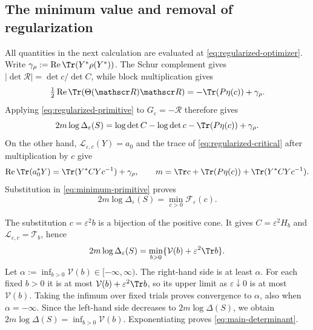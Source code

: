 \subsection{The minimum value and removal of regularization}
All quantities in the next calculation are evaluated at \eqref{eq:regularized-optimizer}.
Write $\gamma_\rho:=\operatorname{Re}\Tr(Y^*\rho(Y^*))$.
The Schur complement gives $|\det\mathscr R|=\det c/\det C$, while block multiplication gives
\[
 \tfrac12\operatorname{Re}\Tr(\Theta(\mathscr R)\mathscr R)
       =-\Tr(P\eta(c))+\gamma_\rho.
\]
Applying \eqref{eq:regularized-primitive} to $G_\varepsilon=-\mathscr R$ therefore gives
\begin{equation}\label{eq:minimum-primitive}
 2m\log\Delta_\varepsilon(S)
 =\log\det C-\log\det c-\Tr(P\eta(c))+\gamma_\rho.
\end{equation}
On the other hand, $\mathcal L_{\varepsilon,c}(Y)=a_0$ and the trace of \eqref{eq:regularized-critical} after multiplication by $c$ give
\[
 \operatorname{Re}\Tr(a_0^*Y)=\Tr(Y^*CYc^{-1})+\gamma_\rho,
 \qquad
 m=\Tr c+\Tr(P\eta(c))+\Tr(Y^*CYc^{-1}).
\]
Substitution in \eqref{eq:minimum-primitive} proves
\begin{equation}\label{eq:regularized-minimum}
 2m\log\Delta_\varepsilon(S)=\min_{c>0}\mathcal F_\varepsilon(c).
\end{equation}

The substitution $c=\varepsilon^2b$ is a bijection of the positive cone.
It gives $C=\varepsilon^2H_b$ and $\mathcal L_{\varepsilon,c}=\mathcal T_b$, hence
\begin{equation}\label{eq:scaled-minimum}
 2m\log\Delta_\varepsilon(S)
      =\min_{b>0}\{\mathcal V(b)+\varepsilon^2\Tr b\}.
\end{equation}
Let $\alpha:=\inf_{b>0}\mathcal V(b)\in[-\infty,\infty)$.
The right-hand side is at least $\alpha$.
For each fixed $b>0$ it is at most $\mathcal V(b)+\varepsilon^2\Tr b$, so its upper limit as $\varepsilon\downarrow0$ is at most $\mathcal V(b)$.
Taking the infimum over fixed trials proves convergence to $\alpha$, also when $\alpha=-\infty$.
Since the left-hand side decreases to $2m\log\Delta(S)$, we obtain $2m\log\Delta(S)=\inf_{b>0}\mathcal V(b)$.
Exponentiating proves \eqref{eq:main-determinant}.


